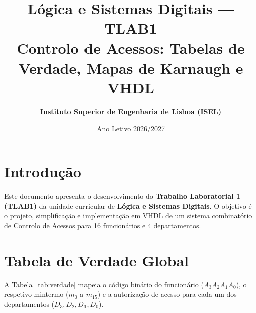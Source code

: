 \documentclass[11pt,a4paper]{article}
\title{\textbf{\Large Lógica e Sistemas Digitais --- TLAB1}\\
\large Controlo de Acessos: Tabelas de Verdade, Mapas de Karnaugh e VHDL}
\author{\textbf{Instituto Superior de Engenharia de Lisboa (ISEL)}}
\date{Ano Letivo 2026/2027}
\begin{document}
\maketitle

\section{Introdução}
Este documento apresenta o desenvolvimento do \textbf{Trabalho Laboratorial 1 (TLAB1)} da unidade curricular de \textbf{Lógica e Sistemas Digitais}. O objetivo é o projeto, simplificação e implementação em VHDL de um sistema combinatório de Controlo de Acessos para 16 funcionários e 4 departamentos.

\section{Tabela de Verdade Global}
A Tabela~\ref{tab:verdade} mapeia o código binário do funcionário ($A_3 A_2 A_1 A_0$), o respetivo mintermo ($m_0$ a $m_{15}$) e a autorização de acesso para cada um dos departamentos ($D_3, D_2, D_1, D_0$).
\end{document}
